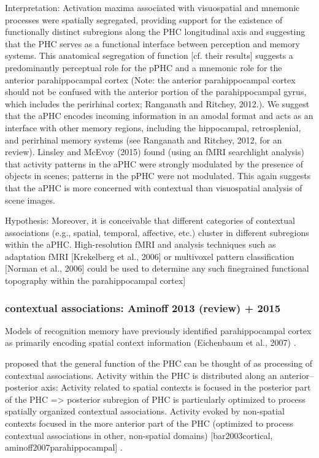 \documentclass[english]{article}
\begin{document}
%
Interpretation: Activation maxima associated with visuospatial and mnemonic
processes were spatially segregated, providing support for the existence of
functionally distinct subregions along the PHC longitudinal axis and suggesting
that the PHC serves as a functional interface between perception and memory
systems\citep{baumann2016functional}.
%
This anatomical segregation of function [cf. their results] suggests a
predominantly perceptual role for the pPHC and a mnemonic role for the anterior
parahippocampal cortex (Note: the anterior parahippocampal cortex should not be
confused with the anterior portion of the parahippocampal gyrus, which includes
the perirhinal cortex; Ranganath and Ritchey,
2012.)\citep{baumann2016functional}.
%
We suggest that the aPHC encodes incoming information in an amodal format and
acts as an interface with other memory regions, including the hippocampal,
retrosplenial, and perirhinal memory systems (see Ranganath and Ritchey, 2012,
for an review)\citep{baumann2016functional}.
%
Linsley and McEvoy (2015) found (using an fMRI searchlight analysis) that
activity patterns in the aPHC were strongly modulated by the presence of objects
in scenes; patterns in the pPHC were not modulated. This again suggests that the
aPHC is more concerned with contextual than visuospatial analysis of scene
images\citep{baumann2016functional}.

%
Hypothesis: Moreover, it is conceivable that different categories of contextual
associations (e.g., spatial, temporal, affective, etc.) cluster in different
subregions within the aPHC.  High-resolution fMRI and analysis techniques such
as adaptation fMRI [Krekelberg et al., 2006] or multivoxel pattern
classification [Norman et al., 2006] could be used to determine any such
finegrained functional topography within the parahippocampal cortex]


\subsubsection{contextual associations: Aminoff 2013 (review) + 2015}


Models of recognition memory have previously identified parahippocampal cortex
as primarily encoding spatial context information (Eichenbaum et al., 2007)
\citep{baldassano2013differential}.

\citep{aminoff2013role} proposed that the general function of the PHC can be
thought of as processing of contextual associations. Activity within the PHC is
distributed along an anterior–posterior axis:
Activity related to spatial contexts is focused in the posterior part of the PHC
=> posterior subregion of PHC is particularly optimized to process spatially
organized contextual associations.
Activity evoked by non-spatial contexts focused in the more anterior part of the
PHC (optimized to process contextual associations in other, non-spatial domains)
[bar2003cortical, aminoff2007parahippocampal] \citep{aminoff2013role}.
\end{document}
